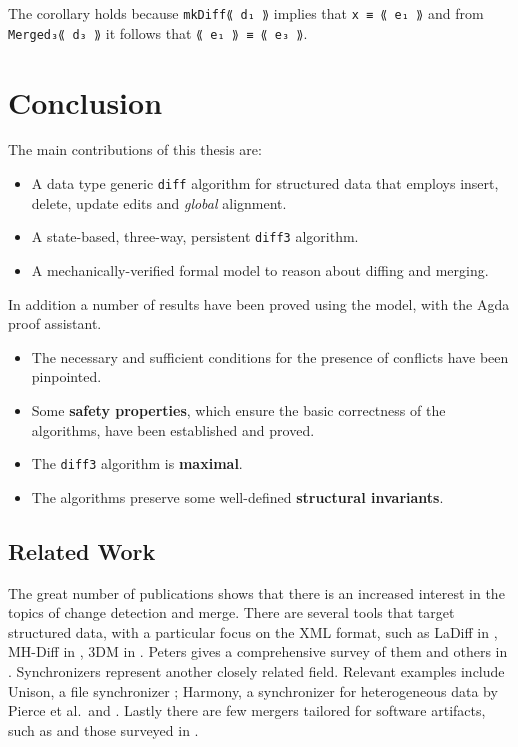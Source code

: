\documentclass[../Thesis.tex]{subfiles}
\begin{document}
	The corollary holds because \texttt{mkDiff⟪ d₁ ⟫} implies that
	\texttt{x ≡ ⟪ e₁ ⟫} and from \texttt{Merged₃⟪ d₃ ⟫} it follows
	that \texttt{⟪ e₁ ⟫ ≡ ⟪ e₃ ⟫}.
	
\section{Conclusion}
The main contributions of this thesis are:
\begin{itemize}
	\item A data type generic \texttt{diff} algorithm for structured
			data that employs insert, delete, update edits and \emph{global} 
			alignment.
	\item A state-based, three-way, persistent \texttt{diff3} algorithm.
	\item A mechanically-verified formal model to reason about diffing 
				and merging.
\end{itemize}

In addition a number of results have been proved using the model, with
the Agda proof assistant.
\begin{itemize}
	\item The necessary and sufficient conditions for the presence of conflicts 
	have been pinpointed.
	\item Some \textbf{safety properties}, which ensure the basic correctness 
	of the algorithms, have been established and proved.
	\item The \texttt{diff3} algorithm is \textbf{maximal}.
	\item The algorithms preserve some well-defined \textbf{structural invariants}.
\end{itemize}

	\subsection{Related Work}
	\label{subsec:RelatedWork}
	The great number of publications shows that there is an increased 
	interest in the topics of change detection and merge.
	There are several tools that target structured data, with a particular
	focus on the XML format, such as 
	LaDiff in \cite{Chawathe96}, MH-Diff in \cite{Chawathe97}, 3DM in 
	\cite{Lind01, Lind04, Lind05}.
	Peters gives a comprehensive survey of them and others in 
	\cite{PetersSurvey}.
	Synchronizers represent another closely related field.
	Relevant examples include Unison, a file synchronizer \cite{Pierce98, 
	UnisonSpec}; Harmony, a synchronizer for 
	heterogeneous data	\cite{HarmonyOverview,Pierce07} by Pierce et al.\ and
	\cite{Ramsey01}.
	Lastly there are few mergers tailored for software artifacts, such
	as \cite{Westfechtel91, Apel11} and those surveyed in \cite{Mens02}.
\end{document}
